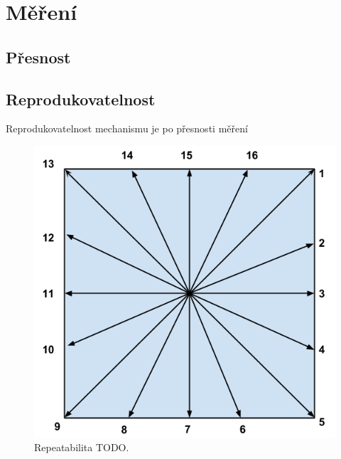 \chapter{Měření}

\section{Přesnost}
\section{Reprodukovatelnost}
Reprodukovatelnost mechanismu je po přesnosti měření 

\begin{figure}[h!]
  \centering
    \includegraphics[width=0.9\linewidth]{obrazky/repeatability.png}%
    \caption{Repeatabilita TODO.}
    \label{fig:repeatability}
\end{figure}
